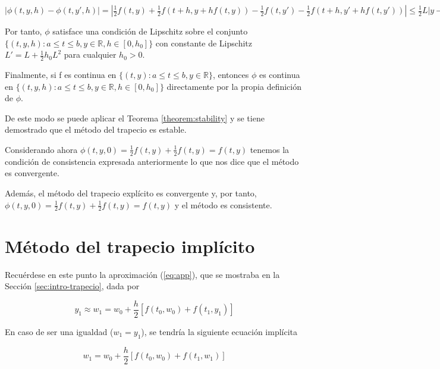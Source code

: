 \documentclass{article}
\theoremstyle{theorem-style}  %
\theoremstyle{definition-style}
\theoremstyle{example-style}
\begin{document}
	$|\phi(t,y,h)-\phi(t,y',h)|=|\frac{1}{2}f(t,y)+\frac{1}{2}f(t+h,y+hf(t,y))-\frac{1}{2}f(t,y')-\frac{1}{2}f(t+h,y'+hf(t,y'))|
	\leq
	\frac{1}{2}L|y-y'|+\frac{1}{2}L|y+hf(t,y)-y'-hf(t,y')| \leq L |y-y'|+\frac{1}{2}L|hf(t,y)-hf(t,y')|=(L+\frac{1}{2}hL^{2})|y-y'|$


	Por tanto, $\phi$ satisface una condición de Lipschitz sobre el conjunto
	$\{(t,y,h):a \leq t \leq b, y \in \mathbb{R}, h \in [0,h_0]\}$
	con constante de Lipschitz
	$L'=L+\frac{1}{2} h_0 L^{2}$
	para cualquier $h_0 > 0$.

    Finalmente, si f es continua en $\{(t,y):a \leq t \leq b, y \in \mathbb{R}\}$, entonces $\phi$ es continua en  $\{(t,y,h):a \leq t \leq b, y \in \mathbb{R}, h \in [0,h_0]\}$ directamente por la propia definición de $\phi$.

	De este modo se puede aplicar el Teorema \ref{theorem:stability} y se tiene demostrado que el método del trapecio es estable.

	Considerando ahora $\phi(t,y,0)=\frac{1}{2}f(t,y)+\frac{1}{2}f(t,y)=f(t,y)$ tenemos la condición de consistencia expresada anteriormente lo que nos dice que el método es convergente.

    Además, el método del trapecio explícito es convergente y, por tanto,  $\phi(t,y,0)=\frac{1}{2}f(t,y)+\frac{1}{2}f(t,y)=f(t,y)$ y el método es consistente.


\section{Método del trapecio implícito} \label{sec:trapecio-iterativo}

	Recuérdese en este punto la aproximación (\ref{eq:app}), que se mostraba en la Sección \ref{sec:intro-trapecio}, dada por

	\begin{equation*}
		y_1 \approx w_1 = w_0 + \frac{h}{2} \left[f(t_0,w_0) + f(t_1, y_1)\right]
	\end{equation*}

	En caso de ser una igualdad ($w_1 = y_1$), se tendría la siguiente ecuación implícita

	\begin{equation*}
		w_1 = w_0 + \frac{h}{2} \left[f(t_0,w_0) + f(t_1, w_1)\right]
	\end{equation*}
\end{document}
